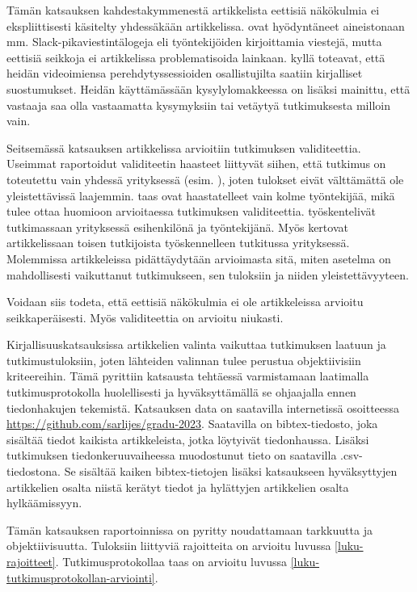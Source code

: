 \documentclass[utf8]{gradu3}
\begin{document}
Tämän katsauksen kahdestakymmenestä artikkelista eettisiä näkökulmia ei ekspliittisesti käsitelty yhdessäkään artikkelissa. \textcite{moe-ym-2020} ovat hyödyntäneet aineistonaan mm. Slack-pikaviestintälogeja eli työntekijöiden kirjoittamia viestejä, mutta eettisiä seikkoja ei artikkelissa problematisoida lainkaan. \textcite{yates-ym-2020} kyllä toteavat, että heidän videoimiensa perehdytyssessioiden osallistujilta saatiin kirjalliset suostumukset. Heidän käyttämässään kysylylomakkeessa on lisäksi mainittu, että vastaaja saa olla vastaamatta kysymyksiin tai vetäytyä tutkimuksesta milloin vain. 

Seitsemässä katsauksen artikkelissa arvioitiin tutkimuksen validiteettia. Useimmat raportoidut validiteetin haasteet liittyvät siihen, että tutkimus on toteutettu vain yhdessä yrityksessä (esim. \textcite{johnson-senges-2010}), joten tulokset eivät välttämättä ole yleistettävissä laajemmin. \textcite{viana-ym-2014} taas ovat haastatelleet vain kolme työntekijää, mikä tulee ottaa huomioon arvioitaessa tutkimuksen validiteettia. \textcite{hemphill-begel-2011} työskentelivät tutkimassaan yrityksessä esihenkilönä ja työntekijänä. Myös \textcite{kumar-wallace-2019} kertovat artikkelissaan toisen tutkijoista työskennelleen tutkitussa yrityksessä. Molemmissa artikkeleissa pidättäydytään arvioimasta sitä, miten asetelma on mahdollisesti vaikuttanut tutkimukseen, sen tuloksiin ja niiden yleistettävyyteen.

Voidaan siis todeta, että eettisiä näkökulmia ei ole artikkeleissa arvioitu seikkaperäisesti. Myös validiteettia on arvioitu niukasti.

Kirjallisuuskatsauksissa artikkelien valinta vaikuttaa tutkimuksen laatuun ja tutkimustuloksiin, joten lähteiden valinnan tulee perustua objektiivisiin kriteereihin. Tämä pyrittiin katsausta tehtäessä varmistamaan laatimalla tutkimusprotokolla huolellisesti ja hyväksyttämällä se ohjaajalla ennen tiedonhakujen tekemistä. Katsauksen data on saatavilla internetissä osoitteessa 
 \href{https://github.com/sarlijes/gradu-2023}{https://github.com/sarlijes/gradu-2023}. Saatavilla on bibtex-tiedosto, joka sisältää tiedot kaikista artikkeleista, jotka löytyivät tiedonhaussa. Lisäksi tutkimuksen tiedonkeruuvaiheessa muodostunut tieto on saatavilla .csv-tiedostona. Se sisältää kaiken bibtex-tietojen lisäksi katsaukseen hyväksyttyjen artikkelien osalta niistä kerätyt tiedot ja hylättyjen artikkelien osalta hylkäämissyyn. 

Tämän katsauksen raportoinnissa on pyritty noudattamaan tarkkuutta ja objektiivisuutta. Tuloksiin liittyviä rajoitteita on arvioitu luvussa \ref{luku-rajoitteet}. Tutkimusprotokollaa taas on arvioitu luvussa \ref{luku-tutkimusprotokollan-arviointi}.


\printbibliography
\end{document}
